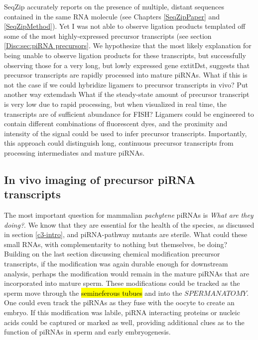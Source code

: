     
    SeqZip accurately reports on the presence of multiple, distant sequences contained in the same RNA molecule (see Chapters \ref{SeqZipPaper} and \ref{SeqZipMethod}). Yet I was not able to observe ligation products templated off some of the most highly-expressed precursor transcripts (see section \ref{Disc:sec:piRNA precursors}. We hypothesize that the most likely explanation for being unable to observe ligation products for these transcripts, but successfully observing those for a very long, but lowly expressed gene   extit{Dst}, suggests that precursor transcripts are rapidly processed into mature piRNAs. What if this is not the case if we could hybridize ligamers to precursor transcripts in vivo? Put another way  extemdash What if the steady-state amount of precursor transcript is very low due to rapid processing, but when visualized in real time, the transcripts are of sufficient abundance for FISH? Ligamers could be engineered to contain different combinations of fluorescent dyes, and the proximity and intensity of the signal could be used to infer precursor transcripts. Importantly, this approach could distinguish long, continuous precursor transcripts from processing intermediates and mature piRNAs.

  \subsection{In vivo imaging of precursor piRNA transcripts}\label{Disc:subsec:Imaging of precursors}

    The most important question for mammalian \textit{pachytene} piRNAs is \textit{What are they doing?}. We know that they are essential for the health of the species, as discussed in section \ref{c3-intro}, and piRNA-pathway mutants are sterile. What could these small RNAs, with complementarity to nothing but themselves, be doing? Building on the last section discussing chemical modification precursor transcripts, if the modification was again durable enough for downstream analysis, perhaps the modification would remain in the mature piRNAs that are incorporated into mature sperm. These modifications could be tracked as the sperm move through the \hl{semineferous tubues} and into the $SPERM ANATOMY$. One could even track the piRNAs as they fuse with the oocyte to create an embryo. If this modification was labile, piRNA interacting proteins or nucleic acids could be captured or marked as well, providing additional clues as to the function of piRNAs in sperm and early embryogenesis.


